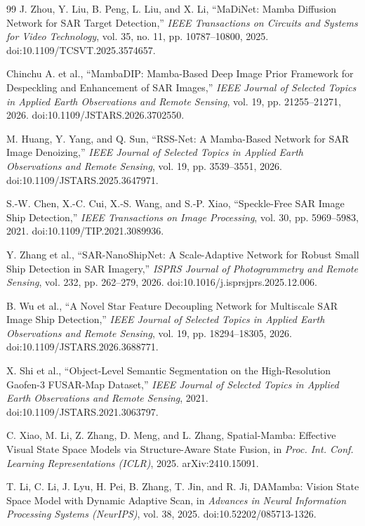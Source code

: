 \documentclass[journal]{IEEEtran}
\begin{document}
\begin{thebibliography}{99}
J. Zhou, Y. Liu, B. Peng, L. Liu, and X. Li,
``MaDiNet: Mamba Diffusion Network for SAR Target Detection,''
\emph{IEEE Transactions on Circuits and Systems for Video Technology},
vol. 35, no. 11, pp. 10787--10800, 2025. doi:10.1109/TCSVT.2025.3574657.

Chinchu A. et al., ``MambaDIP: Mamba-Based Deep Image Prior Framework for Despeckling and Enhancement of SAR Images,'' \emph{IEEE Journal of Selected Topics in Applied Earth Observations and Remote Sensing}, vol. 19, pp. 21255--21271, 2026. doi:10.1109/JSTARS.2026.3702550.

M. Huang, Y. Yang, and Q. Sun, ``RSS-Net: A Mamba-Based Network for SAR Image Denoizing,'' \emph{IEEE Journal of Selected Topics in Applied Earth Observations and Remote Sensing}, vol. 19, pp. 3539--3551, 2026. doi:10.1109/JSTARS.2025.3647971.

S.-W. Chen, X.-C. Cui, X.-S. Wang, and S.-P. Xiao, ``Speckle-Free SAR Image Ship Detection,'' \emph{IEEE Transactions on Image Processing}, vol. 30, pp. 5969--5983, 2021. doi:10.1109/TIP.2021.3089936.

Y. Zhang et al., ``SAR-NanoShipNet: A Scale-Adaptive Network for Robust Small Ship Detection in SAR Imagery,'' \emph{ISPRS Journal of Photogrammetry and Remote Sensing}, vol. 232, pp. 262--279, 2026. doi:10.1016/j.isprsjprs.2025.12.006.

B. Wu et al., ``A Novel Star Feature Decoupling Network for Multiscale SAR Image Ship Detection,'' \emph{IEEE Journal of Selected Topics in Applied Earth Observations and Remote Sensing}, vol. 19, pp. 18294--18305, 2026. doi:10.1109/JSTARS.2026.3688771.

X. Shi et al., ``Object-Level Semantic Segmentation on the High-Resolution Gaofen-3 FUSAR-Map Dataset,'' \emph{IEEE Journal of Selected Topics in Applied Earth Observations and Remote Sensing}, 2021. doi:10.1109/JSTARS.2021.3063797.

C. Xiao, M. Li, Z. Zhang, D. Meng, and L. Zhang, Spatial-Mamba: Effective Visual State Space Models via Structure-Aware State Fusion, in \emph{Proc. Int. Conf. Learning Representations (ICLR)}, 2025. arXiv:2410.15091.

T. Li, C. Li, J. Lyu, H. Pei, B. Zhang, T. Jin, and R. Ji, DAMamba: Vision State Space Model with Dynamic Adaptive Scan, in \emph{Advances in Neural Information Processing Systems (NeurIPS)}, vol. 38, 2025. doi:10.52202/085713-1326.


\end{thebibliography}
\end{document}
